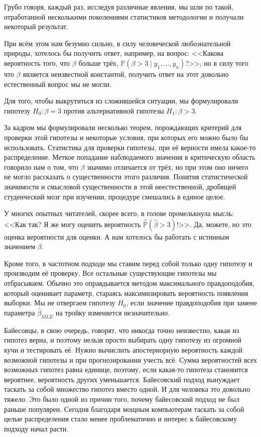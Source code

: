 \documentclass[12pt, a4paper, oneside]{extreport}
\def \hb{\hat{\beta}}
\def \b{\beta}
\def \mbb{\mathbb}
\def \PP{\mbb{P}}
\theoremstyle{plain}              %
\theoremstyle{definition}         %
\begin{document}
Грубо говоря, каждый раз, исследуя различные явления, мы шли по такой, отработанной несколькими поколениями статистиков методологии и получали некоторый результат.

При всём этом нам безумно сильно, в силу человеческой любознательной природы, хотелось бы получить ответ, например, на вопрос: <<Какова вероятность того, что $\beta$ больше трёх, $\PP(\beta > 3 \mid y_1, \ldots, y_n)$?>>, но в силу того что $\beta$ является неизвестной константой, получить ответ на этот довольно естественный вопрос мы не могли.

Для того, чтобы выкрутиться из сложившейся ситуации, мы формулировали гипотезу $ H_0 : \beta = 3 $ против альтернативной гипотезы $ H_1 : \beta > 3.$

За кадром мы формулировали  несколько теорем, порождающих критерий для проверки этой гипотезы и некоторые условия, при которых его можно было бы использовать. Статистика для проверки гипотезы, при её верности имела какое-то распределение. Меткое попадание наблюдаемого значения в критическую область говорило нам о том, что $\beta$ значимо отличается от трёх, но при этом оно ничего не могло  рассказать о существенности этого различия. Понятия статистической значимости и смысловой существенности в этой неестественной, дробящей студенческий мозг при изучении, процедуре смешались в единое целое.

У многих опытных читателей, скорее всего, в голове промелькнула мысль: <<Как так? Я же могу оценить вероятность $\hat{\PP} ( \hb > 3)$!>>.  Да, можете, но это оценка вероятности для оценки. А нам хотелось бы работать с истинным значением $\b$.

Кроме того, в частотном подходе мы ставим перед собой только одну гипотезу и производим её проверку. Все остальные существующие гипотезы мы отбрасываем. Обычно это оправдывается методом максимального правдоподобия, который оценивает параметр, стараясь максимизировать вероятность появления выборки. Мы не отвергаем гипотезу $H_0$, если значение правдоподобия при замене параметра $\hb_{MLE}$ на тройку изменяется незначительно.

Байесовцы, в свою очередь, говорят, что никогда точно неизвестно, какая из гипотез верна, и поэтому нельзя просто выбирать одну гипотезу из огромной кучи и тестировать её. Нужно вычислить апостериорную вероятность каждой возможной гипотезы и при прогнозировании учесть всё. Сумма вероятностей всех возможных гипотез равна единице, поэтому, если какая-то гипотеза становится вероятнее, вероятность других уменьшается. Байесовский подход вынуждает таскать за собой множество гипотез вместо одной. И для человека это довольно тяжело. Это было одной из причин того, почему байесовский подход не был раньше популярен. Сегодня благодаря мощным компьютерам таскать за собой целые распределения стало менее проблематично и интерес к байесовскому подходу начал расти.
\end{document}
